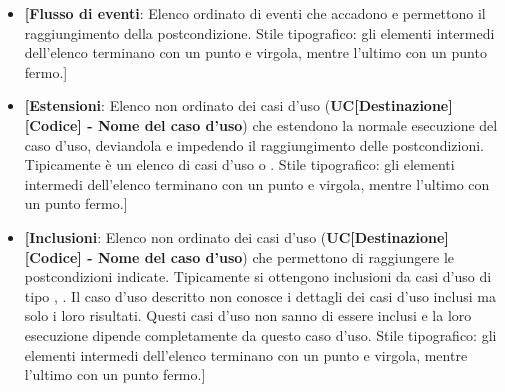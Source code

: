 \begin{itemize}
	\item \textbf{[Flusso di eventi}: Elenco ordinato di eventi che accadono e permettono il raggiungimento  della postcondizione.
	Stile tipografico: gli elementi intermedi dell'elenco terminano con un punto e virgola, mentre l'ultimo con un punto fermo.]
	\item \textbf{[Estensioni}: Elenco non ordinato dei casi d'uso (\textbf{UC[Destinazione] [Codice] - Nome del caso d'uso}) che estendono la normale esecuzione del caso d'uso, deviandola e impedendo il raggiungimento delle postcondizioni.
	Tipicamente è un elenco di casi d'uso  o .
	Stile tipografico: gli elementi intermedi dell'elenco terminano con un punto e virgola, mentre l'ultimo con un punto fermo.]
	\item \textbf{[Inclusioni}: Elenco non ordinato dei casi d'uso (\textbf{UC[Destinazione] [Codice] - Nome del caso d'uso}) che permettono di raggiungere le postcondizioni indicate.
	Tipicamente si ottengono inclusioni da casi d'uso di tipo , .
	Il caso d'uso descritto non conosce i dettagli dei casi d'uso inclusi ma solo i loro risultati.
	Questi casi d'uso non sanno di essere inclusi e la loro esecuzione dipende completamente da questo caso d'uso.
	Stile tipografico: gli elementi intermedi dell'elenco terminano con un punto e virgola, mentre l'ultimo con un punto fermo.]
\end{itemize}

